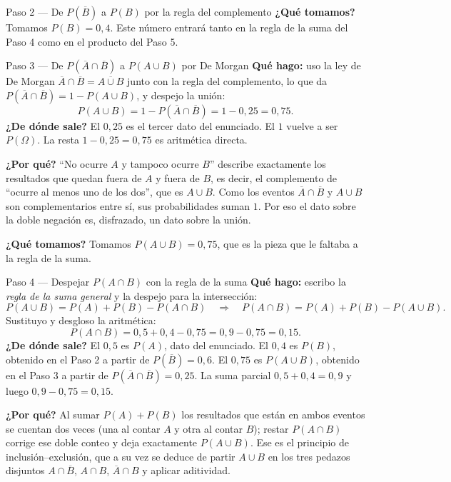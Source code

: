 \documentclass[11pt]{article}
\begin{document}
\begin{sol}
\begin{paso}{Paso 2 --- De $P(\overline{B})$ a $P(B)$ por la regla del complemento}
\textbf{¿Qué tomamos?} Tomamos $P(B)=0{,}4$. Este número entrará tanto en la regla de la suma
del Paso 4 como en el producto del Paso 5.
\end{paso}

\begin{paso}{Paso 3 --- De $P(\overline{A}\cap\overline{B})$ a $P(A\cup B)$ por De Morgan}
\textbf{Qué hago:} uso la ley de De Morgan
$\overline{A}\cap\overline{B}=\overline{A\cup B}$ junto con la regla del complemento, lo que
da $P(\overline{A}\cap\overline{B})=1-P(A\cup B)$, y despejo la unión:
\[
P(A\cup B)=1-P(\overline{A}\cap\overline{B})=1-0{,}25=0{,}75.
\]
\textbf{¿De dónde sale?} El $0{,}25$ es el tercer dato del enunciado. El $1$ vuelve a ser
$P(\Omega)$. La resta $1-0{,}25=0{,}75$ es aritmética directa.

\textbf{¿Por qué?} ``No ocurre $A$ y tampoco ocurre $B$'' describe exactamente los resultados
que quedan fuera de $A$ y fuera de $B$, es decir, el complemento de ``ocurre al menos uno de
los dos'', que es $A\cup B$. Como los eventos $\overline{A}\cap\overline{B}$ y $A\cup B$ son
complementarios entre sí, sus probabilidades suman $1$. Por eso el dato sobre la doble
negación es, disfrazado, un dato sobre la unión.

\textbf{¿Qué tomamos?} Tomamos $P(A\cup B)=0{,}75$, que es la pieza que le faltaba a la regla
de la suma.
\end{paso}

\begin{paso}{Paso 4 --- Despejar $P(A\cap B)$ con la regla de la suma}
\textbf{Qué hago:} escribo la \emph{regla de la suma general} y la despejo para la
intersección:
\[
P(A\cup B)=P(A)+P(B)-P(A\cap B)
\quad\Longrightarrow\quad
P(A\cap B)=P(A)+P(B)-P(A\cup B).
\]
Sustituyo y desgloso la aritmética:
\[
P(A\cap B)=0{,}5+0{,}4-0{,}75=0{,}9-0{,}75=0{,}15.
\]
\textbf{¿De dónde sale?} El $0{,}5$ es $P(A)$, dato del enunciado. El $0{,}4$ es $P(B)$,
obtenido en el Paso 2 a partir de $P(\overline{B})=0{,}6$. El $0{,}75$ es $P(A\cup B)$,
obtenido en el Paso 3 a partir de $P(\overline{A}\cap\overline{B})=0{,}25$. La suma parcial
$0{,}5+0{,}4=0{,}9$ y luego $0{,}9-0{,}75=0{,}15$.

\textbf{¿Por qué?} Al sumar $P(A)+P(B)$ los resultados que están en ambos eventos se cuentan
dos veces (una al contar $A$ y otra al contar $B$); restar $P(A\cap B)$ corrige ese doble
conteo y deja exactamente $P(A\cup B)$. Ese es el principio de inclusión--exclusión, que a su
vez se deduce de partir $A\cup B$ en los tres pedazos disjuntos
$A\cap\overline{B}$, $A\cap B$, $\overline{A}\cap B$ y aplicar aditividad.


\end{paso}
\end{sol}
\end{document}
